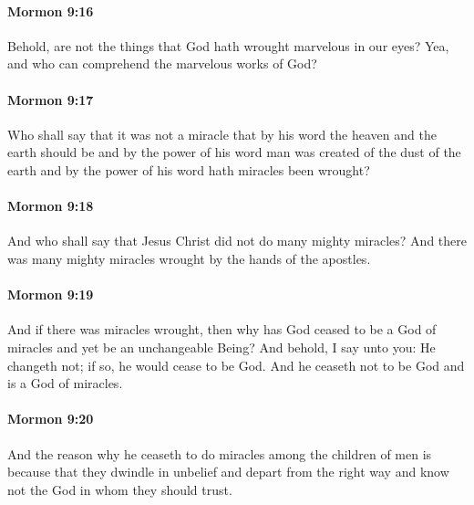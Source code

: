 		\paragraph{Mormon 9:16} %
			\label{MORMON-9-16}

			Behold, are not the things that God hath wrought marvelous in our eyes?
			Yea, and who can comprehend the marvelous works of God?

		\paragraph{Mormon 9:17} %
			\label{MORMON-9-17}

			Who shall say that it was not a miracle
			that by his word the heaven and the earth should be
			and by the power of his word man was created of the dust of the earth
			and by the power of his word hath miracles been wrought?

		\paragraph{Mormon 9:18} %
			\label{MORMON-9-18}

			And who shall say that Jesus Christ did not do many mighty miracles?
			And there was many mighty miracles wrought by the hands of the apostles.

		\paragraph{Mormon 9:19} %
			\label{MORMON-9-19}

			And if there was miracles wrought,
			then why has God ceased to be a God of miracles
			and yet be an unchangeable Being?
			And behold, I say unto you:
			He changeth not;
			if so, he would cease to be God.
			And he ceaseth not to be God and is a God of miracles.

		\paragraph{Mormon 9:20} %
			\label{MORMON-9-20}

			And the reason why he ceaseth to do miracles among the children of men
			is because that they dwindle in unbelief
			and depart from the right way
			and know not the God in whom they should trust.

